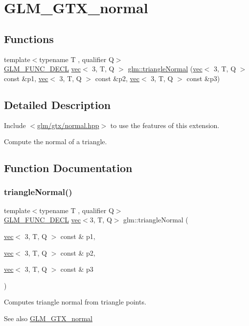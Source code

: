 \hypertarget{group__gtx__normal}{}\section{G\+L\+M\+\_\+\+G\+T\+X\+\_\+normal}
\label{group__gtx__normal}
\subsection*{Functions}
\begin{DoxyCompactItemize}
\item 
{\footnotesize template$<$typename T , qualifier Q$>$ }\\\hyperlink{setup_8hpp_ab2d052de21a70539923e9bcbf6e83a51}{G\+L\+M\+\_\+\+F\+U\+N\+C\+\_\+\+D\+E\+CL} \hyperlink{structglm_1_1vec}{vec}$<$ 3, T, Q $>$ \hyperlink{group__gtx__normal_gaff1cb5496925dfa7962df457772a7f35}{glm\+::triangle\+Normal} (\hyperlink{structglm_1_1vec}{vec}$<$ 3, T, Q $>$ const \&p1, \hyperlink{structglm_1_1vec}{vec}$<$ 3, T, Q $>$ const \&p2, \hyperlink{structglm_1_1vec}{vec}$<$ 3, T, Q $>$ const \&p3)
\end{DoxyCompactItemize}


\subsection{Detailed Description}
Include $<$\hyperlink{normal_8hpp}{glm/gtx/normal.\+hpp}$>$ to use the features of this extension.

Compute the normal of a triangle. 

\subsection{Function Documentation}
\mbox{\label{group__gtx__normal_gaff1cb5496925dfa7962df457772a7f35}} 
\subsubsection{\texorpdfstring{triangle\+Normal()}{triangleNormal()}}
{\footnotesize\ttfamily template$<$typename T , qualifier Q$>$ \\
\hyperlink{setup_8hpp_ab2d052de21a70539923e9bcbf6e83a51}{G\+L\+M\+\_\+\+F\+U\+N\+C\+\_\+\+D\+E\+CL} \hyperlink{structglm_1_1vec}{vec}$<$3, T, Q$>$ glm\+::triangle\+Normal (\begin{DoxyParamCaption}\item[{\hyperlink{structglm_1_1vec}{vec}$<$ 3, T, Q $>$ const \&}]{p1,  }\item[{\hyperlink{structglm_1_1vec}{vec}$<$ 3, T, Q $>$ const \&}]{p2,  }\item[{\hyperlink{structglm_1_1vec}{vec}$<$ 3, T, Q $>$ const \&}]{p3 }\end{DoxyParamCaption})}

Computes triangle normal from triangle points.

\begin{DoxySeeAlso}{See also}
\hyperlink{group__gtx__normal}{G\+L\+M\+\_\+\+G\+T\+X\+\_\+normal} 
\end{DoxySeeAlso}
